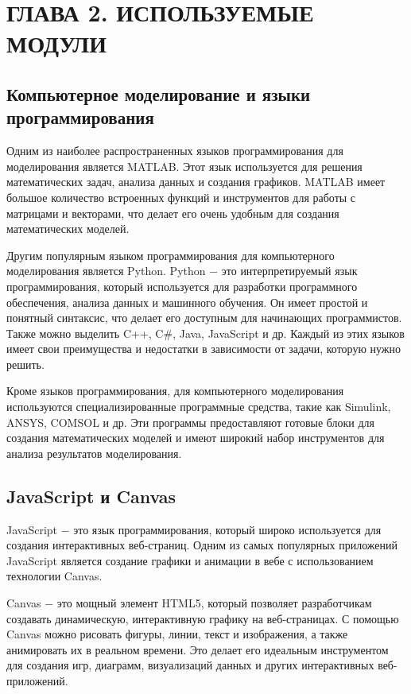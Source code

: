 \chapter{ГЛАВА 2. ИСПОЛЬЗУЕМЫЕ МОДУЛИ}
\label{ch:chapter2}

\section{Компьютерное моделирование и языки программирования}

Одним из наиболее распространенных языков программирования для моделирования является MATLAB. Этот язык используется для решения математических задач, анализа данных и создания графиков. MATLAB имеет большое количество встроенных функций и инструментов для работы с матрицами и векторами, что делает его очень удобным для создания математических моделей.

Другим популярным языком программирования для компьютерного моделирования является Python. Python $-$ это интерпретируемый язык программирования, который используется для разработки программного обеспечения, анализа данных и машинного обучения. Он имеет простой и понятный синтаксис, что делает его доступным для начинающих программистов. Также можно выделить C++, C\#, Java, JavaScript и др. Каждый из этих языков имеет свои преимущества и недостатки в зависимости от задачи, которую нужно решить.

Кроме языков программирования, для компьютерного моделирования используются специализированные программные средства, такие как Simulink, ANSYS, COMSOL и др. Эти программы предоставляют готовые блоки для создания математических моделей и имеют широкий набор инструментов для анализа результатов моделирования.

\section{JavaScript и Canvas}

JavaScript $-$ это язык программирования, который широко используется для создания интерактивных веб-страниц. Одним из самых популярных приложений JavaScript является создание графики и анимации в вебе с использованием технологии Canvas.

Canvas $-$ это мощный элемент HTML5, который позволяет разработчикам создавать динамическую, интерактивную графику на веб-страницах. С помощью Canvas можно рисовать фигуры, линии, текст и изображения, а также анимировать их в реальном времени. Это делает его идеальным инструментом для создания игр, диаграмм, визуализаций данных и других интерактивных веб-приложений.

